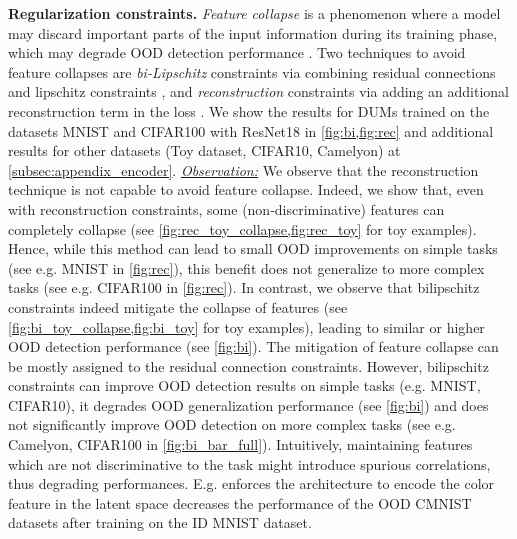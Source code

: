 \textbf{Regularization constraints.} \emph{Feature collapse} is a phenomenon where a model may discard important parts of the input information during its training phase, which may degrade OOD detection performance \citep{van2021due}. Two techniques to avoid feature collapses are \textit{bi-Lipschitz} constraints via combining residual connections and lipschitz constraints \citep{liu2020sngp}, and \textit{reconstruction} constraints via adding an additional reconstruction term in the loss \citep{postels2020reconstruction}. We show the results for DUMs trained on the datasets MNIST and CIFAR100 with ResNet18 in \cref{fig:bi,fig:rec} and additional results for other datasets (Toy dataset, CIFAR10, Camelyon) at \cref{subsec:appendix_encoder}. \underline{\textit{Observation:}} We observe that the reconstruction technique is not capable to avoid feature collapse. Indeed, we show  that, even with reconstruction constraints, some (non-discriminative) features can completely collapse (see \cref{fig:rec_toy_collapse,fig:rec_toy} for toy examples). Hence, while this method can lead to small OOD improvements on simple tasks (see e.g. MNIST in \cref{fig:rec}), this benefit does not generalize to more complex tasks (see e.g. CIFAR100 in \cref{fig:rec}). In contrast, we observe that bilipschitz constraints indeed mitigate the collapse of features (see \cref{fig:bi_toy_collapse,fig:bi_toy} for toy examples), leading to similar or higher OOD detection performance (see \cref{fig:bi}). The mitigation of feature collapse can be mostly assigned to the residual connection constraints. However, bilipschitz constraints can improve OOD detection results on simple tasks (e.g. MNIST, CIFAR10), it degrades OOD generalization performance (see \cref{fig:bi}) and does not significantly improve OOD detection on more complex tasks (see e.g. Camelyon, CIFAR100 in \cref{fig:bi_bar_full}). Intuitively, maintaining features which are not discriminative to the task might introduce spurious correlations, thus degrading performances. E.g. enforces the architecture to encode the color feature in the latent space decreases the performance of the OOD CMNIST datasets after training on the ID MNIST dataset. 

